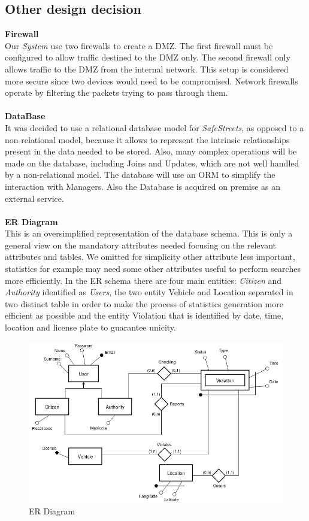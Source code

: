 \documentclass{article}
\begin{document}
\subsection{Other design decision}
\textbf{Firewall}\\
Our \textit{System} use two firewalls to create a DMZ. The first 
firewall must be configured to allow traffic destined to the DMZ only. The second firewall only 
allows traffic to the DMZ from the internal network. This setup is considered more secure since two 
devices would need to be compromised. Network firewalls operate by filtering the packets trying to 
pass through them.
\\ 
\\
\textbf{DataBase}\\
It was decided to use a relational database model for \textit{SafeStreets}, as opposed to a 
non-relational model, because it allows to represent the intrinsic relationships present in 
the data needed to be stored. Also, many complex operations will be made on the database, 
including Joins and Updates, which are not well handled by a non-relational model. The database will use
an ORM to simplify the interaction with Managers. Also the Database is acquired on premise as 
an external service.
\\ 
\\
\textbf{ER Diagram}\\
This is an oversimplified representation of the database schema. This is only a general view 
on the mandatory attributes needed focusing on the relevant attributes and tables. We omitted 
for simplicity other attribute less important, statistics for example may need some other attributes 
useful to perform searches more efficiently. In the ER schema there are four main entities:  
\textit{Citizen} and \textit{Authority} identified as \textit{Users}, the two entity Vehicle and 
Location separated in two distinct table in order to make the process of statistics generation more 
efficient as possible and the entity Violation that is identified by date, time, location and license 
plate to guarantee unicity. 

\begin{figure}[H]
    \centering
    \includegraphics[scale=0.5]{img/ER_diagram.png}
    \caption{ER Diagram}
\end{figure}
\end{document}
